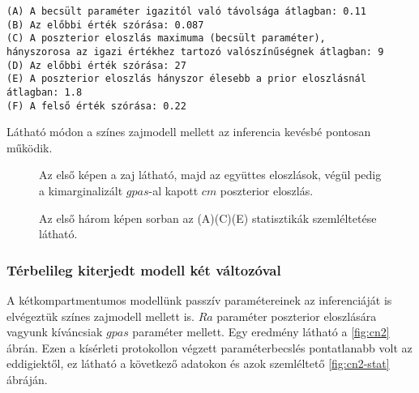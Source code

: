 \begin{verbatim}
(A) A becsült paraméter igazitól való távolsága átlagban: 0.11
(B) Az előbbi érték szórása: 0.087
(C) A poszterior eloszlás maximuma (becsült paraméter), 
hányszorosa az igazi értékhez tartozó valószínűségnek átlagban: 9
(D) Az előbbi érték szórása: 27
(E) A poszterior eloszlás hányszor élesebb a prior eloszlásnál átlagban: 1.8
(F) A felső érték szórása: 0.22
\end{verbatim}

Látható módon a színes zajmodell mellett az inferencia kevésbé pontosan működik.

\begin{figure}
	\hfill
	\hfill
	\hfill
	\vfill
	\hfill
	\caption[Egykompartmentum, színes zaj, két paraméter inferencia]{Az első képen a zaj látható, majd az együttes eloszlások, végül pedig a kimarginalizált $gpas$-al kapott $cm$ poszterior eloszlás.}%
	\label{fig:cn1}
\end{figure}

\begin{figure}
	\hfill
	\hfill
	\hfill
	\vfill
	\caption[Egykompartmentumos, színes zaj, két paraméter statisztika]{Az első három képen sorban az (A)(C)(E) statisztikák szemléltetése látható.}%
	\label{fig:cn1-stat}
\end{figure}

\FloatBarrier
\subsubsection{Térbelileg kiterjedt modell két változóval}
A kétkompartmentumos modellünk passzív paramétereinek az inferenciáját is elvégeztük színes zajmodell mellett is. $Ra$ paraméter poszterior eloszlására vagyunk kíváncsiak $gpas$ paraméter mellett. Egy eredmény látható a \ref{fig:cn2} ábrán. Ezen a kísérleti protokollon végzett paraméterbecslés pontatlanabb volt az eddigiektől, ez látható a következő adatokon és azok szemléltető \ref{fig:cn2-stat} ábráján.

